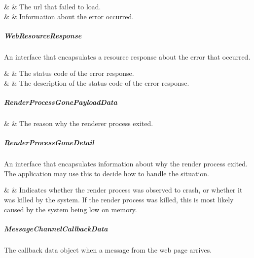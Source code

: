 \begin{interfacedesc}
             &               & The \ac{url} that failed to load. \\ \hline
   &  & Information about the error occurred. \\ \hline
\end{interfacedesc}

\subparagraph{WebResourceResponse}

An interface that encapsulates a resource response about the error that occurred.

\begin{interfacedesc}
   &  & The status code of the error response. \\ \hline
     &  & The description of the status code of the error response. \\ \hline
\end{interfacedesc}

\subparagraph{RenderProcessGonePayloadData}

\begin{interfacedesc}
   &  & The reason why the renderer process exited. \\ \hline
\end{interfacedesc}

\subparagraph{RenderProcessGoneDetail}

An interface that encapsulates information about why the render process exited.
The application may use this to decide how to handle the situation.

\begin{interfacedesc}
   &  & Indicates whether the render process was observed to crash, or whether it was killed by the system. If the render process was killed, this is most likely caused by the system being low on memory. \\ \hline
\end{interfacedesc}

\subparagraph{MessageChannelCallbackData}

The callback data object when a message from the web page arrives.

